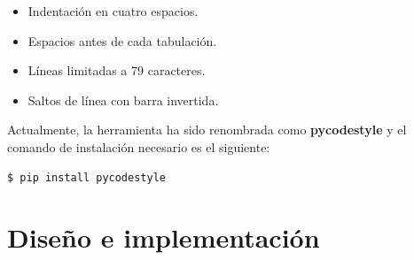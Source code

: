 \documentclass[a4paper, 12pt]{book}
\begin{document}
\begin{itemize}
	\item Indentación en cuatro espacios.
	\item Espacios antes de cada tabulación.
	\item Líneas limitadas a 79 caracteres.
	\item Saltos de línea con barra invertida.
\end{itemize}

Actualmente, la herramienta ha sido renombrada como \textbf{pycodestyle} y el comando de instalación necesario es el siguiente:

\begin{lstlisting}[style=consola,numbers=none]
$ pip install pycodestyle
\end{lstlisting}





\cleardoublepage
\chapter{Diseño e implementación}
\end{document}
